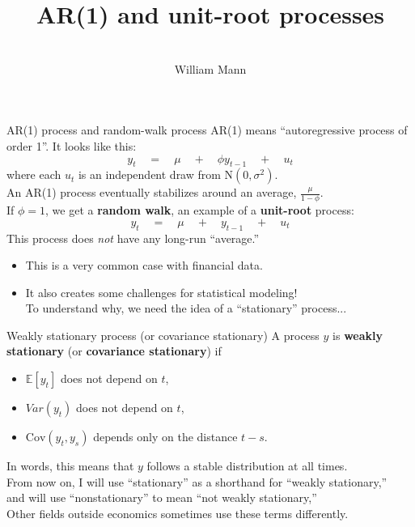 \documentclass[t,12pt]{beamer}
\begin{document}
\title[AR(1) and unit-root processes]{AR(1) and unit-root processes}
\author{\vspace{0.35in} \\ {\selectfont William Mann} \vspace{-0.35in}}

\date{}
\maketitle

\begin{frame}[c]{AR(1) process and random-walk process}
AR(1) means ``autoregressive process of order 1''. It looks like this:
$$
y_t \quad = \quad \mu \quad + \quad \phi y_{t-1} \quad + \quad u_t
$$
where each $u_t$ is an independent draw from $\text{N}(0,\sigma^2)$.
\\ \smallskip
An AR(1) process eventually stabilizes around an average, $\frac{\mu}{1-\phi}$. %
\\ \medskip
If $\phi=1$, we get a \textbf{random walk}, an example of a \textbf{unit-root} process:
$$
y_t \quad = \quad \mu \quad + \quad y_{t-1} \quad + \quad u_t
$$
This process does \emph{not} have any long-run ``average.''
\begin{itemize}
\item This is a very common case with financial data.
\item It also creates some challenges for statistical modeling!
\\ To understand why, we need the idea of a ``stationary'' process...
\end{itemize}
\end{frame}

\begin{frame}[c]{Weakly stationary process (or covariance stationary)}
\label{weakly_stationary}
A process $y$ is \textbf{weakly stationary} (or \textbf{covariance stationary}) if
\begin{itemize}
\medskip
\item $\mathbb{E}[y_t]$ does not depend on $t$,
\item $Var(y_t)$ does not depend on $t$,
\item $\text{Cov}(y_t,y_s)$ depends only on the distance $t-s$.
\end{itemize}
\bigskip
In words, this means that $y$ follows a stable distribution at all times.
\\ \vfill
{\footnotesize
From now on, I will use ``stationary'' as a shorthand for ``weakly stationary,''
\\
and will use ``nonstationary'' to mean ``not weakly stationary,''
\\ 
Other fields outside economics sometimes use these terms differently.
}
\end{frame}
\end{document}
